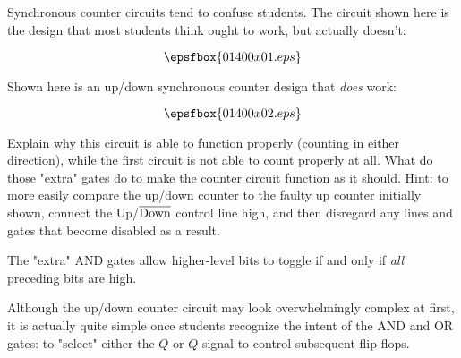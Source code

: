 

Synchronous counter circuits tend to confuse students.  The circuit shown here is the design that most students think ought to work, but actually doesn't:

$$\epsfbox{01400x01.eps}$$

\vskip 10pt

Shown here is an up/down synchronous counter design that {\it does} work:

$$\epsfbox{01400x02.eps}$$

Explain why this circuit is able to function properly (counting in either direction), while the first circuit is not able to count properly at all.  What do those "extra" gates do to make the counter circuit function as it should.  Hint: to more easily compare the up/down counter to the faulty up counter initially shown, connect the Up/$\overline{\hbox{Down}}$ control line high, and then disregard any lines and gates that become disabled as a result.







The "extra" AND gates allow higher-level bits to toggle if and only if {\it all} preceding bits are high.







Although the up/down counter circuit may look overwhelmingly complex at first, it is actually quite simple once students recognize the intent of the AND and OR gates: to "select" either the $Q$ or $\overline{Q}$ signal to control subsequent flip-flops.




